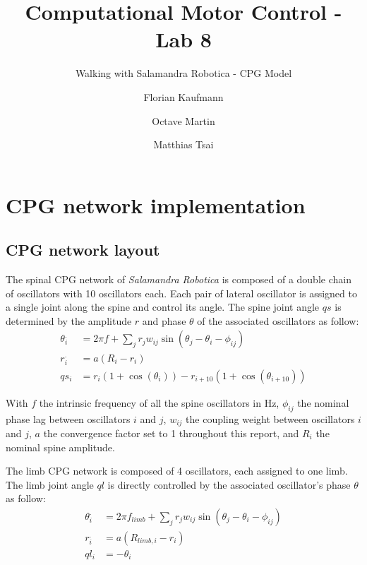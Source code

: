 \documentclass[a4paper]{scrartcl}
\title{Computational Motor Control - Lab 8}
\subtitle{Walking with Salamandra Robotica - CPG Model}
\author{Florian Kaufmann \and Octave Martin \and Matthias Tsai}
\begin{document}
{\twocolumn

\setlength{\columnsep}{0.5cm}
\maketitle

\section{CPG network implementation}

\subsection*{CPG network layout}
The spinal CPG network of \textit{Salamandra Robotica} is composed of a double chain of oscillators with 10 oscillators each. Each pair of lateral oscillator is assigned to a single joint along the spine and control its angle. The spine joint angle $qs$ is determined by the amplitude $r$ and phase $\theta$ of the associated oscillators as follow:
\begin{subequations}\label{eq:spineCPG}
 \begin{align}
  \theta_{i}^{.} &= 2 \pi f + \sum_{j}\nolimits r_{j} w_{ij} \sin(\theta_{j} - \theta_{i} - \phi_{ij}) \label{eq:spineCPG_phase}\\
  r_{i}^{.} &= a(R_{i}-r_{i}) \label{eq:spineCPG_amplitude}\\
  qs_{i} &= r_{i}(1+\cos(\theta_{i})) - r_{i+10}(1+\cos(\theta_{i+10})) \label{eq:spineCPG_angle}
 \end{align}
\end{subequations}

With $f$ the intrinsic frequency of all the spine oscillators in Hz, $\phi_{ij}$ the nominal phase lag between oscillators $i$ and $j$, $w_{ij}$ the coupling weight between oscillators $i$ and $j$, $a$ the convergence factor set to 1 throughout this report, and $R_{i}$ the nominal spine amplitude.

The limb CPG network is composed of 4 oscillators, each assigned to one limb. The limb joint angle $ql$ is directly controlled by the associated oscillator's phase $\theta$ as follow:
\begin{subequations}\label{eq:limbCPG}
 \begin{align}
  \theta_{i}^{.} &= 2 \pi f_{limb} + \sum_{j}\nolimits r_{j} w_{ij} \sin(\theta_{j} - \theta_{i} - \phi_{ij}) \label{eq:limbCPG_phase}\\
  r_{i}^{.} &= a(R_{limb,i}-r_{i}) \label{eq:limbCPG_amplitude}\\
  ql_{i} &= -\theta_{i} \label{eq:limbCPG_angle}
 \end{align}
\end{subequations}

}
\end{document}

